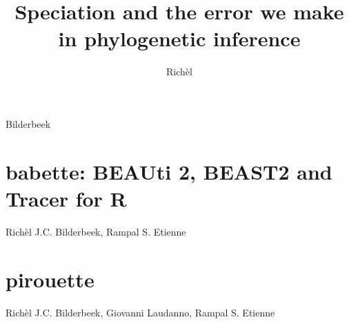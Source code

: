 \documentclass[]{dissertation}
\newcommand\blankpage{%
    \null
    \thispagestyle{empty}%
    \addtocounter{page}{-1}%
    \newpage}
\begin{document}
\title{Speciation and the error we make in phylogenetic inference}
\author{Richèl}{Bilderbeek}

\frontmatter



\tableofcontents

\mainmatter

\thumbtrue



\afterpage{\blankpage}






\chapter{babette: BEAUti 2, BEAST2 and Tracer for R}
\label{chapter_babette}
Rich\`el J.C. Bilderbeek, Rampal S. Etienne
\newpage



\chapter{pirouette}
\label{chapter_pirouette}
Rich\`el J.C. Bilderbeek, Giovanni Laudanno, Rampal S. Etienne
\newpage


\end{document}
